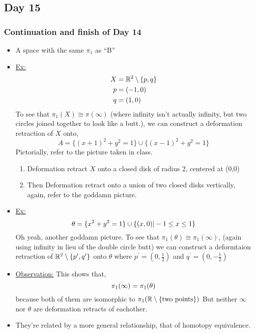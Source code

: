 \subsection{Day 15}
\subsubsection{Continuation and finish of Day 14}
\begin{itemize}
    \item A space with the same $\pi_1$ as ``B''
    \item \underline{Ex:}
        \begin{align*}
            X &= \mathbb{R}^2\setminus\{p,q\}\\
            p &= (-1,0)\\
            q &= (1,0)\\
        \end{align*}
        To see that $\pi_1(X) \cong \pi(\infty)$ (where infinity isn't actually infinity,
        but two circles joined together to look like a butt.), we can construct a 
        deformation retraction of $X$ onto,
        \[
            A=\{(x+1)^2+y^2=1\}\cup \{(x-1)^2+y^2=1\}
        \]
        Pictorially, refer to the picture taken in class.
        \begin{enumerate}
            \item Deformation retract $X$ onto a closed disk of radius 2, centered
                at (0,0)
            \item Then Deformation retract onto a union of two closed disks vertically, 
                again, refer to the goddamn picture.
        \end{enumerate}
    \item
        \underline{Ex:}
        \[
            \theta=\{x^2+y^2=1\}\cup\{(x,0)| -1 \leq x \leq 1\}\\
        \]
        Oh yeah, another goddamn picture. To see that $\pi_1(\theta)\cong\pi_{1}(\infty)$,
        (again using infinity in lieu of the double circle butt)
        we can construct a deformtaion retraction of $\mathbb{R}^2\setminus\{p^{\prime},q^{\prime}\}$
        onto $\theta$ where $p^{\prime}=(0,\frac{1}{2})$ and $q^{\prime}=(0,-\frac{1}{2})$
    \item \underline{Observation:} This shows that,
        \[
            \pi_1(\infty)=\pi_1(\theta)\\
        \]
        because both of them are isomorphic to $\pi_1(\mathbb{R}\setminus\{\text{two points}\})$
        But neither $\infty$ nor $\theta$ are deformation retracts of eachother.
    \item They're related by a more general relationship, that of homotopy equivalence.
\end{itemize}
